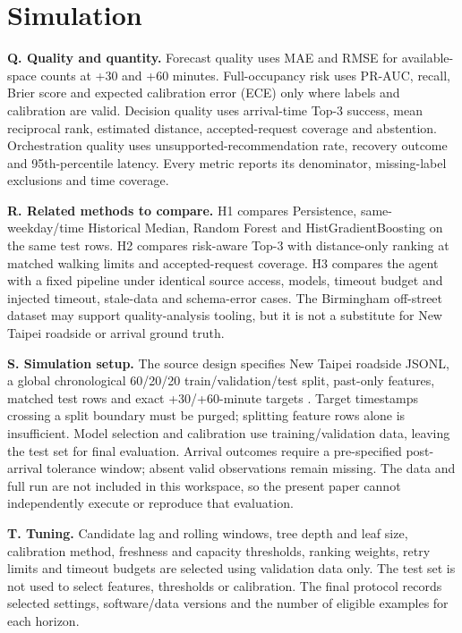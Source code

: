 \documentclass[conference,letterpaper,10pt]{IEEEtran}
\begin{document}
\section{Simulation}
\noindent\textbf{Q. Quality and quantity.} Forecast quality uses MAE and RMSE for available-space counts at +30 and +60 minutes. Full-occupancy risk uses PR-AUC, recall, Brier score and expected calibration error (ECE) only where labels and calibration are valid. Decision quality uses arrival-time Top-3 success, mean reciprocal rank, estimated distance, accepted-request coverage and abstention. Orchestration quality uses unsupported-recommendation rate, recovery outcome and 95th-percentile latency. Every metric reports its denominator, missing-label exclusions and time coverage.

\noindent\textbf{R. Related methods to compare.} H1 compares Persistence, same-weekday/time Historical Median, Random Forest and HistGradientBoosting on the same test rows. H2 compares risk-aware Top-3 with distance-only ranking at matched walking limits and accepted-request coverage. H3 compares the agent with a fixed pipeline under identical source access, models, timeout budget and injected timeout, stale-data and schema-error cases. The Birmingham off-street dataset may support quality-analysis tooling, but it is not a substitute for New Taipei roadside or arrival ground truth.

\noindent\textbf{S. Simulation setup.} The source design specifies New Taipei roadside JSONL, a global chronological 60/20/20 train/validation/test split, past-only features, matched test rows and exact +30/+60-minute targets \cite{dic3design}. Target timestamps crossing a split boundary must be purged; splitting feature rows alone is insufficient. Model selection and calibration use training/validation data, leaving the test set for final evaluation. Arrival outcomes require a pre-specified post-arrival tolerance window; absent valid observations remain missing. The data and full run are not included in this workspace, so the present paper cannot independently execute or reproduce that evaluation.

\noindent\textbf{T. Tuning.} Candidate lag and rolling windows, tree depth and leaf size, calibration method, freshness and capacity thresholds, ranking weights, retry limits and timeout budgets are selected using validation data only. The test set is not used to select features, thresholds or calibration. The final protocol records selected settings, software/data versions and the number of eligible examples for each horizon.
\end{document}
